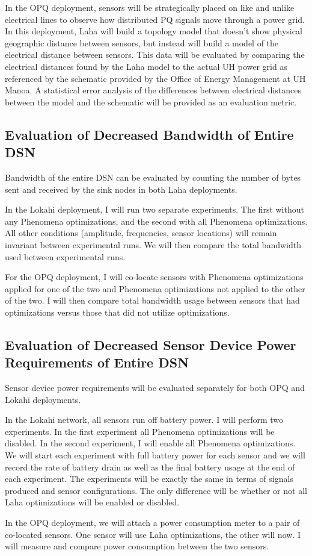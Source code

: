 In the OPQ deployment, sensors will be strategically placed on like and unlike electrical lines to observe how distributed PQ signals move through a power grid. In this deployment, Laha will build a topology model that doesn't show physical geographic distance between sensors, but instead will build a model of the electrical distance between sensors. This data will be evaluated by comparing the electrical distances found by the Laha model to the actual UH power grid as referenced by the schematic provided by the Office of Energy Management at UH Manoa. A statistical error analysis of the differences between electrical distances between the model and the schematic will be provided as an evaluation metric.

\subsection{Evaluation of Decreased Bandwidth of Entire DSN}
Bandwidth of the entire DSN can be evaluated by counting the number of bytes sent and received by the sink nodes in both Laha deployments. 

In the Lokahi deployment, I will run two separate experiments. The first without any Phenomena optimizations, and the second with all Phenomena optimizations. All other conditions (amplitude, frequencies, sensor locations) will remain invariant between experimental runs. We will then compare the total bandwidth used between experimental runs.

For the OPQ deployment, I will co-locate sensors with Phenomena optimizations applied for one of the two and Phenomena optimizations not applied to the other of the two. I will then compare total bandwidth usage between sensors that had optimizations versus those that did not utilize optimizations.

\subsection{Evaluation of Decreased Sensor Device Power Requirements of Entire DSN}
Sensor device power requirements will be evaluated separately for both OPQ and Lokahi deployments. 

In the Lokahi network, all sensors run off battery power. I will perform two experiments. In the first experiment all Phenomena optimizations will be disabled. In the second experiment, I will enable all Phenomena optimizations. We will start each experiment with full battery power for each sensor and we will record the rate of battery drain as well as the final battery usage at the end of each experiment. The experiments will be exactly the same in terms of signals produced and sensor configurations. The only difference will be whether or not all Laha optimizations will be enabled or disabled. 

In the OPQ deployment, we will attach a power consumption meter to a pair of co-located sensors. One sensor will use Laha optimizations, the other will now. I will measure and compare power consumption between the two sensors. 